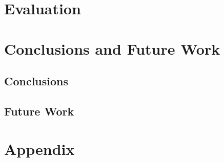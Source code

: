\documentclass{article}
\theoremstyle{definition}
\begin{document}
\section{Evaluation}
\label{sec:evaluation}

\section{Conclusions and Future Work}
\label{sec:conclusion}

\subsection{Conclusions}

\subsection{Future Work}

\printbibliography

\appendix

\section{Appendix}
\label{sec:appendix}
\end{document}
